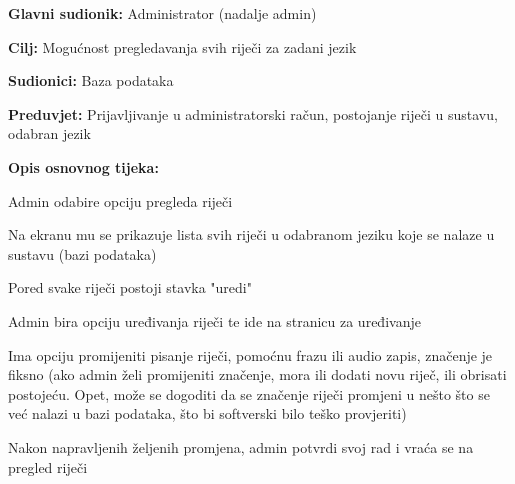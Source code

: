 \noindent {}
\begin{packed_item}

	\item \textbf{Glavni sudionik: } Administrator (nadalje admin)
	\item \textbf{Cilj: } Mogućnost pregledavanja svih riječi za zadani jezik
	\item \textbf{Sudionici: } Baza podataka
	\item \textbf{Preduvjet: } Prijavljivanje u administratorski račun, postojanje riječi u sustavu, odabran jezik
	\item  \textbf{Opis osnovnog tijeka:}
	
	\item[] \begin{packed_enum}
		
		\item Admin odabire opciju pregleda riječi
		\item Na ekranu mu se prikazuje lista svih riječi u odabranom jeziku koje se nalaze u sustavu (bazi podataka)
		\item Pored svake riječi postoji stavka "uredi"
		\item Admin bira opciju uređivanja riječi te ide na stranicu za uređivanje
		\item Ima opciju promijeniti pisanje riječi, pomoćnu frazu ili audio zapis, značenje je fiksno (ako admin želi promijeniti značenje, mora ili dodati novu riječ, ili obrisati postojeću. Opet, može se dogoditi da se značenje riječi promjeni u nešto što se već nalazi u bazi podataka, što bi softverski bilo teško provjeriti)
		\item Nakon napravljenih željenih promjena, admin potvrdi svoj rad i vraća se na pregled riječi

	\end{packed_enum}
	
\end{packed_item}


